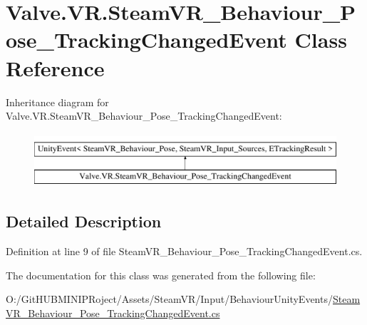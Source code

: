 \hypertarget{class_valve_1_1_v_r_1_1_steam_v_r___behaviour___pose___tracking_changed_event}{}\section{Valve.\+V\+R.\+Steam\+V\+R\+\_\+\+Behaviour\+\_\+\+Pose\+\_\+\+Tracking\+Changed\+Event Class Reference}
\label{class_valve_1_1_v_r_1_1_steam_v_r___behaviour___pose___tracking_changed_event}
Inheritance diagram for Valve.\+V\+R.\+Steam\+V\+R\+\_\+\+Behaviour\+\_\+\+Pose\+\_\+\+Tracking\+Changed\+Event\+:\begin{figure}[H]
\begin{center}
\leavevmode
\includegraphics[height=2.000000cm]{class_valve_1_1_v_r_1_1_steam_v_r___behaviour___pose___tracking_changed_event}
\end{center}
\end{figure}


\subsection{Detailed Description}


Definition at line 9 of file Steam\+V\+R\+\_\+\+Behaviour\+\_\+\+Pose\+\_\+\+Tracking\+Changed\+Event.\+cs.



The documentation for this class was generated from the following file\+:\begin{DoxyCompactItemize}
\item 
O\+:/\+Git\+H\+U\+B\+M\+I\+N\+I\+P\+Roject/\+Assets/\+Steam\+V\+R/\+Input/\+Behaviour\+Unity\+Events/\mbox{\hyperlink{_steam_v_r___behaviour___pose___tracking_changed_event_8cs}{Steam\+V\+R\+\_\+\+Behaviour\+\_\+\+Pose\+\_\+\+Tracking\+Changed\+Event.\+cs}}\end{DoxyCompactItemize}
